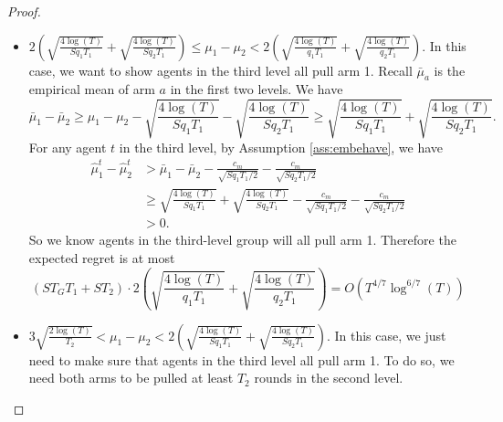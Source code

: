 \begin{proof}
{\begin{itemize}
Now consider the agents in the third level group. Recall $\bar{\mu}_a$ is the empirical mean of arm $a$ in the history they see. We have
\[
\bar{\mu}_1 - \bar{\mu}_2 \geq \mu_1 -\mu_2 - \sqrt{\frac{4\log(T)}{Sq_1T_1}} - \sqrt{\frac{4\log(T)}{Sq_2T_1}} \geq  \sqrt{\frac{4\log(T)}{q_1T_1}} 
+ \sqrt{\frac{4\log(T)}{q_2T_1}}.
\]
Similarly as above, by Assumption \ref{ass:embehave}, we know $\hat{\mu}_1^t - \hat{\mu}_2^t > 0$ for any agent $t$ in the third level. So we know agents in the third-level group will all pull arm 1. Therefore the expected regret is at most $S T_G T_1 = O(T^{4/7} \log^{6/7}(T))$. 


\item $2\left(\sqrt{\frac{4\log(T)}{Sq_1T_1}} 
+ \sqrt{\frac{4\log(T)}{Sq_2T_1}}\right) \leq \mu_1-\mu_2 < 2\left(\sqrt{\frac{4\log(T)}{q_1T_1}} 
+ \sqrt{\frac{4\log(T)}{q_2T_1}}\right)$. In this case, we want to show agents in the third level all pull arm 1. Recall $\bar{\mu}_a$ is the empirical mean of arm $a$ in the first two levels. We have
\[
\bar{\mu}_1 - \bar{\mu}_2 \geq \mu_1 -\mu_2 - \sqrt{\frac{4\log(T)}{Sq_1T_1}} - \sqrt{\frac{4\log(T)}{Sq_2T_1}} \geq  \sqrt{\frac{4\log(T)}{Sq_1T_1}} 
+ \sqrt{\frac{4\log(T)}{Sq_2T_1}}.
\]
For any agent $t$ in the third level, by Assumption \ref{ass:embehave}, we have
\begin{align*}
\hat{\mu}_1^t - \hat{\mu}_2^t &>\bar{\mu}_1 - \bar{\mu}_2 - \frac{c_m}{\sqrt{Sq_1T_1/2}} - \frac{c_m}{\sqrt{Sq_2T_1/2}}\\
&\geq  \sqrt{\frac{4\log(T)}{Sq_1T_1}} + \sqrt{\frac{4\log(T)}{Sq_2T_1}}- \frac{c_m}{\sqrt{Sq_1T_1/2}} - \frac{c_m}{\sqrt{Sq_2T_1/2}}\\
 &> 0.
\end{align*}
So we know agents in the third-level group will all pull arm 1. Therefore the expected regret is at most 
\[
(S T_G T_1 + S T_2) \cdot 2\left(\sqrt{\frac{4\log(T)}{q_1T_1}} 
+ \sqrt{\frac{4\log(T)}{q_2T_1}}\right) = O(T^{4/7} \log^{6/7}(T))
\]

\item $ 3\sqrt{\frac{2\log(T)}{T_2}} < \mu_1-\mu_2 < 2\left(\sqrt{\frac{4\log(T)}{Sq_1T_1}} 
+ \sqrt{\frac{4\log(T)}{Sq_2T_1}}\right)$. In this case, we just need to make sure that agents in the third level all pull arm 1. To do so, we need both arms to be pulled at least $T_2$ rounds in the second level.  


\end{itemize}}
\end{proof}
